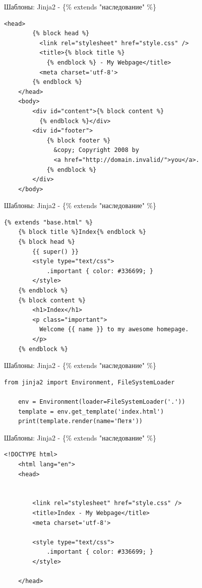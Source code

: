 \begin{frame}[fragile]{Шаблоны: Jinja2 - \{\% extends "наследование" \%\}}

  \begin{lstlisting}[style=html]
    <head>
        {% block head %}
          <link rel="stylesheet" href="style.css" />
          <title>{% block title %}
            {% endblock %} - My Webpage</title>
          <meta charset='utf-8'>
        {% endblock %}
    </head>
    <body>
        <div id="content">{% block content %}
          {% endblock %}</div>
        <div id="footer">
            {% block footer %}
              &copy; Copyright 2008 by
              <a href="http://domain.invalid/">you</a>.
            {% endblock %}
        </div>
    </body>
  \end{lstlisting}

\end{frame}

\begin{frame}[fragile]{Шаблоны: Jinja2 - \{\% extends "наследование" \%\}}

  \begin{lstlisting}[style=html]
    {% extends "base.html" %}
    {% block title %}Index{% endblock %}
    {% block head %}
        {{ super() }}
        <style type="text/css">
            .important { color: #336699; }
        </style>
    {% endblock %}
    {% block content %}
        <h1>Index</h1>
        <p class="important">
          Welcome {{ name }} to my awesome homepage.
        </p>
    {% endblock %}
  \end{lstlisting}

\end{frame}


\begin{frame}[fragile]{Шаблоны: Jinja2 - \{\% extends "наследование" \%\}}

  \begin{lstlisting}[style=python]
    from jinja2 import Environment, FileSystemLoader

    env = Environment(loader=FileSystemLoader('.'))
    template = env.get_template('index.html')
    print(template.render(name='Петя'))
  \end{lstlisting}

\end{frame}

\begin{frame}[fragile]{Шаблоны: Jinja2 - \{\% extends "наследование" \%\}}

  \begin{lstlisting}[style=python]
    <!DOCTYPE html>
    <html lang="en">
    <head>


        <link rel="stylesheet" href="style.css" />
        <title>Index - My Webpage</title>
        <meta charset='utf-8'>

        <style type="text/css">
            .important { color: #336699; }
        </style>

    </head>
  \end{lstlisting}

\end{frame}

